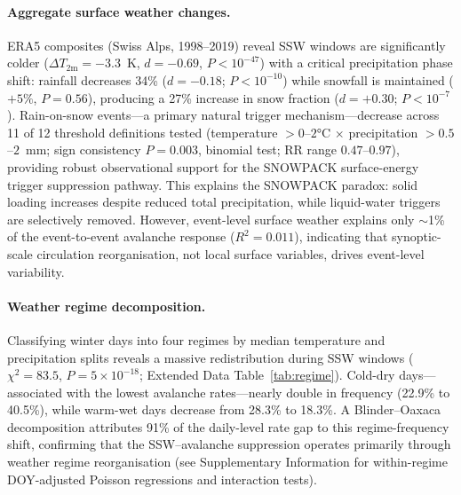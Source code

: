 \documentclass[11pt,letterpaper]{article}
\begin{document}
\paragraph{Aggregate surface weather changes.} ERA5 composites (Swiss Alps, 1998--2019) reveal SSW windows are significantly colder ($\Delta T_{2\mathrm{m}} = -3.3$~K, $d = -0.69$, $P < 10^{-47}$) with a critical precipitation phase shift: rainfall decreases 34\% ($d = -0.18$; $P < 10^{-10}$) while snowfall is maintained ($+5\%$, $P = 0.56$), producing a 27\% increase in snow fraction ($d = +0.30$; $P < 10^{-7}$). Rain-on-snow events---a primary natural trigger mechanism---decrease across 11 of 12 threshold definitions tested (temperature $> 0$--$2$°C $\times$ precipitation $> 0.5$--$2$~mm; sign consistency $P = 0.003$, binomial test; RR range $0.47$--$0.97$), providing robust observational support for the SNOWPACK surface-energy trigger suppression pathway. This explains the SNOWPACK paradox: solid loading increases despite reduced total precipitation, while liquid-water triggers are selectively removed. However, event-level surface weather explains only $\sim$1\% of the event-to-event avalanche response ($R^2 = 0.011$), indicating that synoptic-scale circulation reorganisation, not local surface variables, drives event-level variability.

\paragraph{Weather regime decomposition.} Classifying winter days into four regimes by median temperature and precipitation splits reveals a massive redistribution during SSW windows ($\chi^2 = 83.5$, $P = 5 \times 10^{-18}$; Extended Data Table~\ref{tab:regime}). Cold-dry days---associated with the lowest avalanche rates---nearly double in frequency (22.9\% to 40.5\%), while warm-wet days decrease from 28.3\% to 18.3\%. A Blinder--Oaxaca decomposition attributes 91\% of the daily-level rate gap to this regime-frequency shift, confirming that the SSW--avalanche suppression operates primarily through weather regime reorganisation (see Supplementary Information for within-regime DOY-adjusted Poisson regressions and interaction tests).
\end{document}
